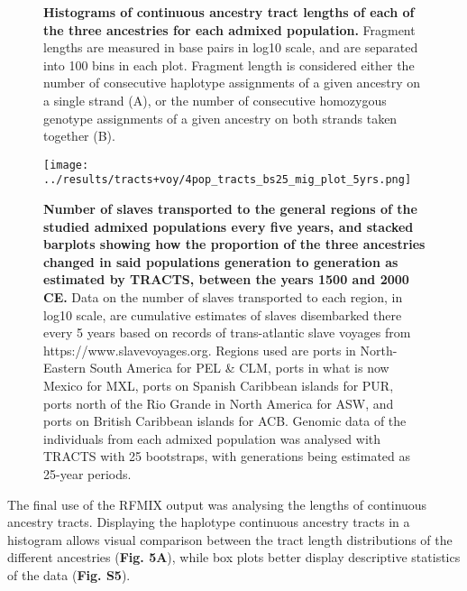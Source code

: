 \documentclass[11pt]{article}
\begin{document}
\begin{figure}[hbt!]%
    \centering
    \vspace*{0em}
    \vspace{.2cm}
    \caption{\textbf{
        Histograms of continuous ancestry tract lengths of each of the three ancestries for each admixed population.
    }
        Fragment lengths are measured in base pairs in log10 scale, and are separated into 100 bins in each plot. Fragment length is considered either the number of consecutive haplotype assignments of a given ancestry on a single strand (A), or the number of consecutive homozygous genotype assignments of a given ancestry on both strands taken together (B).
    }
\end{figure}



\begin{figure}[hbt!]%
    \centering
    \texttt{[image: 
        ../results/tracts+voy/4pop\_tracts\_bs25\_mig\_plot\_5yrs.png]}
    \vspace{-.2cm}
    \caption{\textbf{
        Number of slaves transported to the general regions of the studied admixed populations every five years, and stacked barplots showing how the proportion of the three ancestries changed in said populations generation to generation as estimated by TRACTS, between the years 1500 and 2000 CE.
    }
        Data on the number of slaves transported to each region, in log10 scale, are cumulative estimates of slaves disembarked there every 5 years based on records of trans-atlantic slave voyages from https://www.slavevoyages.org. Regions used are ports in North-Eastern South America for PEL \& CLM, ports in what is now Mexico for MXL, ports on Spanish Caribbean islands for PUR, ports north of the Rio Grande in North America for ASW, and ports on British Caribbean islands for ACB. Genomic data of the individuals from each admixed population was analysed with TRACTS with 25 bootstraps, with generations being estimated as 25-year periods.
    }
\end{figure}




The final use of the RFMIX output was analysing the lengths of continuous ancestry tracts. Displaying the haplotype continuous ancestry tracts in a histogram allows visual comparison between the tract length distributions of the different ancestries (\textbf{Fig. 5A}), while box plots better display descriptive statistics of the data (\textbf{Fig. S5}).
\end{document}
